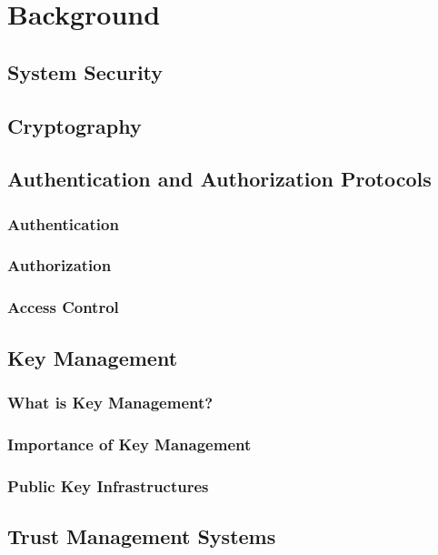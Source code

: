 \chapter{Background}\label{C:background}
\section{System Security}

\section{Cryptography}

\section{Authentication and Authorization Protocols}
	\subsection{Authentication}

	\subsection{Authorization}

	\subsection{Access Control}

\section{Key Management}
	\subsection{What is Key Management?}

	\subsection{Importance of Key Management}

	\subsection{Public Key Infrastructures}

\section{Trust Management Systems}
